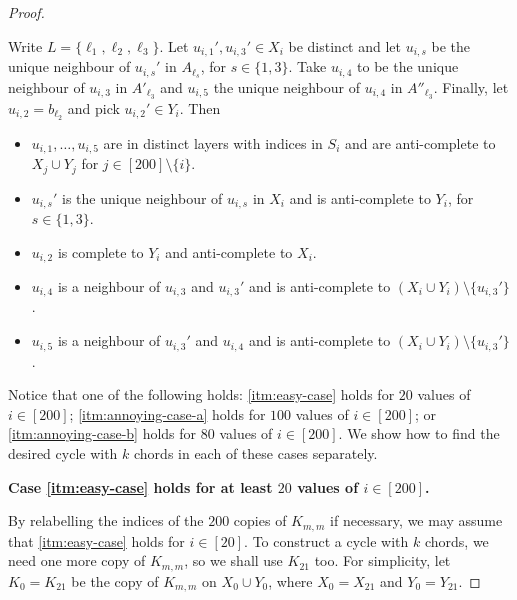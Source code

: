 \documentclass[11pt,english]{article}
\theoremstyle{plain}
\theoremstyle{definition}
\theoremstyle{remark}
\begin{document}
\begin{proof}
\begin{enumerate} [label = \rm(\arabic*)]
				Write $L = \{\ell_1, \ell_2, \ell_3\}$.
				Let $u_{i,1}', u_{i,3}' \in X_i$ be distinct and let $u_{i,s}$ be the unique neighbour of $u_{i,s}'$ in $A_{\ell_s}$, for $s \in \{1,3\}$. Take $u_{i,4}$ to be the unique neighbour of $u_{i,3}$ in $A'_{\ell_3}$ and $u_{i,5}$ the unique neighbour of $u_{i,4}$ in $A''_{\ell_3}$. Finally, let $u_{i,2} = b_{\ell_2}$ and pick $u_{i,2}' \in Y_i$.
				Then
                \begin{itemize}
                    \item
						$u_{i, 1}, \ldots, u_{i, 5}$ are in distinct layers with indices in $S_i$ and are anti-complete to $X_j \cup Y_j$ for $j \in [200] \setminus \{i\}$.
                    \item 
						$u_{i,s}'$ is the unique neighbour of $u_{i,s}$ in $X_i$ and is anti-complete to $Y_i$, for $s \in \{1,3\}$.
                    \item
                        $u_{i, 2}$ is complete to $Y_i$ and anti-complete to $X_i$. 
                    \item
                        $u_{i, 4}$ is a neighbour of $u_{i, 3}$ and $u_{i, 3}'$ and is anti-complete to $(X_i \cup Y_i) \setminus \{u_{i, 3}'\}$.
                    \item
                        $u_{i, 5}$ is a neighbour of $u_{i, 3}'$ and $u_{i, 4}$ and is anti-complete to $(X_i \cup Y_i) \setminus \{u_{i, 3}'\}$.
                \end{itemize}
        \end{enumerate}
        Notice that one of the following holds: \ref{itm:easy-case} holds for $20$ values of $i \in [200]$; \ref{itm:annoying-case-a} holds for $100$ values of $i \in [200]$; or \ref{itm:annoying-case-b} holds for $80$ values of $i \in [200]$.
		We show how to find the desired cycle with $k$ chords in each of these cases separately.
        
        \medskip
        
        \textbf{Case \ref{itm:easy-case} holds for at least $20$ values of $i \in [200]$.}
        
        By relabelling the indices of the $200$ copies of $K_{m,m}$ if necessary, we may assume that \ref{itm:easy-case} holds for $i \in [20]$. To construct a cycle with $k$ chords, we need one more copy of $K_{m,m}$, so we shall use $K_{21}$ too. For simplicity, let $K_0=K_{21}$ be the copy of $K_{m,m}$ on $X_0\cup Y_0$, where $X_0=X_{21}$ and $Y_0=Y_{21}$.
        

\end{proof}
\end{document}
